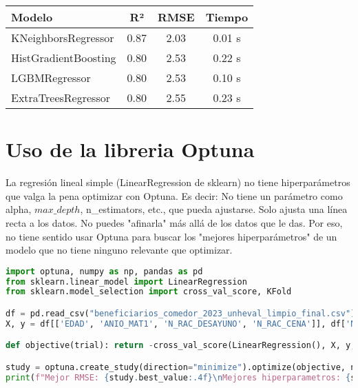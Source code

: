 \documentclass{article}
\begin{document}
\begin{tcolorbox}[colback=gray!5, colframe=black, title=Resultados de Modelos]
\begin{tabular}{lccc}
\toprule
\textbf{Modelo} & \textbf{R²} & \textbf{RMSE} & \textbf{Tiempo} \\
\midrule
KNeighborsRegressor     & 0.87 & 2.03 & 0.01 s \\
HistGradientBoosting    & 0.80 & 2.53 & 0.22 s \\
LGBMRegressor           & 0.80 & 2.53 & 0.10 s \\
ExtraTreesRegressor     & 0.80 & 2.55 & 0.23 s \\
\bottomrule
\end{tabular}
\end{tcolorbox}

\section{Uso de la libreria Optuna}

La regresión lineal simple (LinearRegression de sklearn) no tiene hiperparámetros que valga la pena optimizar con Optuna. Es decir: No tiene un parámetro como alpha, $max\_depth$, n\_estimators, etc., que pueda ajustarse. Solo ajusta una línea recta a los datos. No puedes "afinarla" más allá de los datos que le das. Por eso, no tiene sentido usar Optuna para buscar los "mejores hiperparámetros" de un modelo que no tiene ninguno relevante que optimizar.

\begin{lstlisting}[language=Python, caption={Ejemplo de código en Python}]
import optuna, numpy as np, pandas as pd
from sklearn.linear_model import LinearRegression
from sklearn.model_selection import cross_val_score, KFold

df = pd.read_csv("beneficiarios_comedor_2023_unheval_limpio_final.csv")[lambda x: x['N_RAC_ALMUERZO'] > 0]
X, y = df[['EDAD', 'ANIO_MAT1', 'N_RAC_DESAYUNO', 'N_RAC_CENA']], df['N_RAC_ALMUERZO']

def objective(trial): return -cross_val_score(LinearRegression(), X, y, cv=KFold(5, shuffle=True, random_state=42), scoring='neg_root_mean_squared_error').mean()

study = optuna.create_study(direction="minimize").optimize(objective, n_trials=30)
print(f"Mejor RMSE: {study.best_value:.4f}\nMejores hiperparametros: {study.best_params}")

\end{lstlisting}
\end{document}
